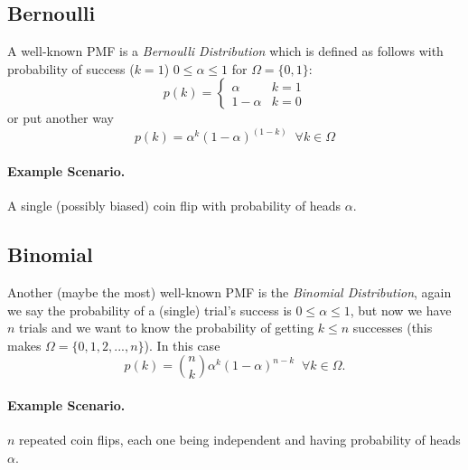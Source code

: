\subsection{Bernoulli} 
A well-known PMF is a \emph{Bernoulli Distribution} which is defined as follows
with probability of success ($k=1$) $0 \le \alpha \le 1$ for $\Omega = \{0,1\}$: 
\[p(k) = \begin{cases}\alpha & k=1\\1-\alpha & k=0\end{cases}\]
or put another way
\[p(k) = \alpha^k(1-\alpha)^{(1-k)} \;\; \forall k\in\Omega\]

\paragraph{Example Scenario.} A single (possibly biased) coin flip with probability of heads $\alpha$.

\subsection{Binomial}
Another (maybe the most) well-known PMF is the \emph{Binomial Distribution}, 
again we say the probability of a (single) trial's success is $0 \le \alpha \le 1$, 
but now we have $n$ trials and we want to know the probability of getting $k\le n$ successes 
(this makes $\Omega = \{0,1,2,...,n\}$).
In this case 
\[p(k) = \binom n k \alpha^k (1-\alpha)^{n-k} \;\; \forall k\in\Omega.\]

\paragraph{Example Scenario.} $n$ repeated coin flips, each one being independent and having probability of heads $\alpha$.

\begin{center}
\end{center}


